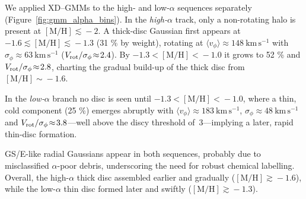 \documentclass[a4paper,10pt]{article}
\begin{document}
\begin{multicols}{2}
We applied XD–GMMs to the high‐ and low‐$\alpha$ sequences separately (Figure~\ref{fig:gmm_alpha_bins}).  
In the \textit{high‐$\alpha$} track, only a non-rotating halo is present at $\mathrm{[M/H]}\!\lesssim\!-2$.  
A thick-disc Gaussian first appears at $-1.6\!\lesssim\!\mathrm{[M/H]}\!\lesssim\!-1.3$ (31 \% by weight), rotating at $\langle v_{\phi}\rangle\!\approx\!148\ \mathrm{km\,s^{-1}}$ with $\sigma_{\phi}\!\approx\!63\ \mathrm{km\,s^{-1}}$ ($V_{\rm rot}/\sigma_{\phi}\!\approx\!2.4$).  
By $-1.3\!<\!\mathrm{[M/H]}\!<\!-1.0$ it grows to 52 \% and $V_{\rm rot}/\sigma_{\phi}\!\approx\!2.8$, charting the gradual build-up of the thick disc from $\mathrm{[M/H]}\!\sim\!-1.6$.

In the \textit{low‐$\alpha$} branch no disc is seen until $-1.3\!<\!\mathrm{[M/H]}\!<\!-1.0$, where a thin, cold component (25 \%) emerges abruptly with $\langle v_{\phi}\rangle\!\approx\!183\ \mathrm{km\,s^{-1}}$, $\sigma_{\phi}\!\approx\!48\ \mathrm{km\,s^{-1}}$ and $V_{\rm rot}/\sigma_{\phi}\!\approx\!3.8$—well above the discy threshold of~3—implying a later, rapid thin-disc formation.

GS/E-like radial Gaussians appear in both sequences, probably due to misclassified $\alpha$-poor debris, underscoring the need for robust chemical labelling.  
Overall, the high-$\alpha$ thick disc assembled earlier and gradually (\mbox{$\mathrm{[M/H]}\!\gtrsim\!-1.6$}), while the low-$\alpha$ thin disc formed later and swiftly (\mbox{$\mathrm{[M/H]}\!\gtrsim\!-1.3$}).



\end{multicols}
\end{document}
